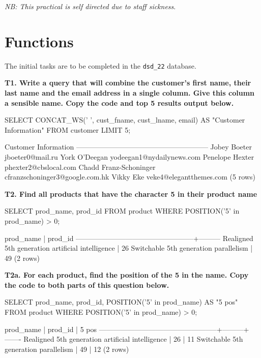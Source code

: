 \textit{NB: This practical is self directed due to staff sickness}.

\section*{Functions}
The initial tasks are to be completed in the \verb|dsd_22| database.

\textbf{T1. Write a query that will combine the customer's first name, their last name and the email address in a single column. Give this column a sensible name. Copy the code and top 5 results output below.}
\begin{sql}
SELECT CONCAT_WS(' ', cust_fname, cust_lname, email) AS "Customer Information" FROM customer LIMIT 5;
\end{sql}
\begin{pseudo}
                  Customer Information
--------------------------------------------------------
 Jobey Boeter jboeter0@mail.ru
 York O'Deegan yodeegan1@nydailynews.com
 Penelope Hexter phexter2@cbslocal.com
 Chadd Franz-Schoninger cfranzschoninger3@google.com.hk
 Vikky Eke veke4@elegantthemes.com
(5 rows)
\end{pseudo}

\textbf{T2. Find all products that have the character 5 in their product name}
\begin{sql}
SELECT prod_name, prod_id FROM product WHERE POSITION('5' in prod_name) > 0;
\end{sql}
\begin{pseudo}
                    prod_name                     | prod_id
--------------------------------------------------+---------
 Realigned 5th generation artificial intelligence |      26
 Switchable 5th generation parallelism            |      49
(2 rows)
\end{pseudo}

\textbf{T2a. For each product, find the position of the 5 in the name. Copy the code to both parts of this question below.}
\begin{sql}
SELECT prod_name, prod_id, POSITION('5' in prod_name) AS "5 pos" FROM product WHERE POSITION('5' in prod_name) > 0;
\end{sql}
\begin{pseudo}
                    prod_name                     | prod_id | 5 pos
--------------------------------------------------+---------+-------
 Realigned 5th generation artificial intelligence |      26 |    11
 Switchable 5th generation parallelism            |      49 |    12
(2 rows)
\end{pseudo}


